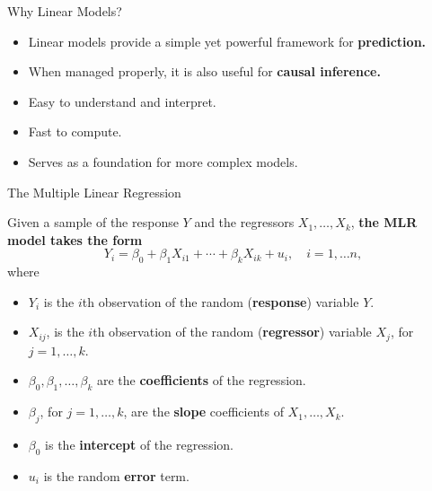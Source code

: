 \documentclass[aspectratio=169]{beamer}
\begin{document}
\begin{frame}{Why Linear Models?}

    \begin{itemize}
        \item Linear models provide a simple yet powerful framework for \textbf{prediction.}
        \item When managed properly, it is also useful for \textbf{causal inference.}
        \item Easy to understand and interpret.
        \item Fast to compute.
        \item Serves as a foundation for more complex models.
    \end{itemize}

\end{frame}

\begin{frame}{The Multiple Linear Regression}

Given a sample of the response $Y$ and the regressors $X_1,\dots, X_k$, \textbf{the MLR model takes the form}
$$
Y_{i} = \beta_{0} + \beta_{1}X_{i1} + \cdots + \beta_{k}X_{ik} + u_{i}, \quad i = 1,\ldots n,
$$
where
\vspace{0.1cm}

\begin{itemize}

    \item $Y_i$ is the $i$th observation of the random (\textbf{response}) variable $Y$.
    
    \item $X_{ij}$, is the $i$th observation of the random (\textbf{regressor}) variable $X_j$, for $j = 1,\dots, k$.


    \item $\beta_0, \beta_1, \dots, \beta_k$ are the \textbf{coefficients} of the regression.

    \item $\beta_j$, for $j = 1, \ldots, k$, are the \textbf{slope} coefficients of $X_1,\dots, X_k$.

    \item $\beta_0$ is the \textbf{intercept} of the regression.

    \item $u_i$ is the random \textbf{error} term.
\end{itemize}

\end{frame}
\end{document}
